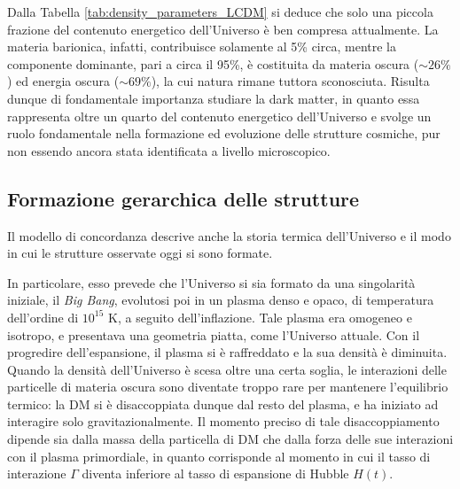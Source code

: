 Dalla Tabella \ref{tab:density_parameters_LCDM} si deduce che solo una piccola frazione del contenuto energetico dell'Universo è ben compresa attualmente. La materia barionica, infatti, contribuisce solamente al 5\% circa, mentre la componente dominante, pari a circa il 95\%, è costituita da materia oscura ($\sim26\%$) ed energia oscura ($\sim69\%$), la cui natura rimane tuttora sconosciuta. Risulta dunque di fondamentale importanza studiare la dark matter, in quanto essa rappresenta oltre un quarto del contenuto energetico dell'Universo e svolge un ruolo fondamentale nella formazione ed evoluzione delle strutture cosmiche, pur non essendo ancora stata identificata a livello microscopico.

\subsection{Formazione gerarchica delle strutture}
\label{sez:hierarchical_formation}
Il modello di concordanza descrive anche la storia termica dell'Universo e il modo in cui le strutture osservate oggi si sono formate.

In particolare, esso prevede che l'Universo si sia formato da una singolarità iniziale, il \emph{Big Bang}, evolutosi poi in un plasma denso e opaco, di temperatura dell'ordine di $10^{15}$ K, a seguito dell'inflazione. Tale plasma era omogeneo e isotropo, e presentava una geometria piatta, come l'Universo attuale. 
Con il progredire dell'espansione, il plasma si è raffreddato e la sua densità è diminuita.
Quando la densità dell'Universo è scesa oltre una certa soglia, le interazioni delle particelle di materia oscura  sono diventate troppo rare per mantenere l'equilibrio termico: la DM si è disaccoppiata dunque dal resto del plasma, e ha iniziato ad interagire solo gravitazionalmente. Il momento preciso di tale disaccoppiamento dipende sia dalla massa della particella di DM che dalla forza delle sue interazioni con il plasma primordiale, in quanto corrisponde al momento in cui il tasso di interazione $\Gamma$ diventa inferiore al tasso di espansione di Hubble $H(t)$. 

